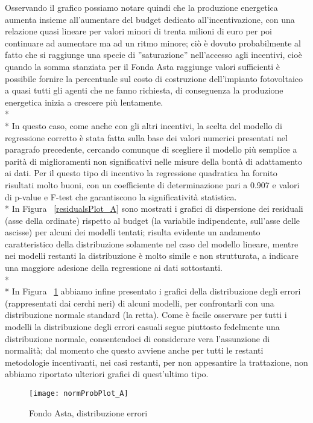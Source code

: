 \documentclass[12pt,a4paper,openright,twoside]{report}
\begin{document}
Osservando il grafico possiamo notare quindi che la produzione energetica aumenta insieme all'aumentare del budget dedicato all'incentivazione, con una relazione quasi lineare per valori minori di trenta milioni di euro per poi continuare ad aumentare ma ad un ritmo minore; ciò è dovuto probabilmente al fatto che si raggiunge una specie di ''saturazione'' nell'accesso agli incentivi, cioè quando la somma stanziata per il Fonda Asta raggiunge valori sufficienti è possibile fornire la percentuale sul costo di costruzione dell'impianto fotovoltaico a quasi tutti gli agenti che ne fanno richiesta, di conseguenza la produzione energetica inizia a crescere più lentamente.\\* \\*
In questo caso, come anche con gli altri incentivi, la scelta del modello di regressione corretto è stata fatta sulla base dei valori numerici presentati nel paragrafo precedente, cercando comunque di scegliere il modello più semplice a parità di miglioramenti non significativi nelle misure della bontà di adattamento ai dati. Per il questo tipo di incentivo la regressione quadratica ha fornito risultati molto buoni, con un coefficiente di determinazione pari a 0.907 e valori di p-value e F-test che garantiscono la significatività statistica.\\*
In Figura ~\ref{residualsPlot_A} sono mostrati i grafici di dispersione dei residuali (asse della ordinate) rispetto al budget (la variabile indipendente, sull'asse delle ascisse) per alcuni dei modelli tentati; risulta evidente un andamento caratteristico della distribuzione solamente nel caso del modello lineare, mentre nei modelli restanti la distribuzione è molto simile e non strutturata, a indicare una maggiore adesione della regressione ai dati sottostanti.\\* \\*
In Figura ~\ref{normProbPlot_A} abbiamo infine presentato i grafici della distribuzione degli errori (rappresentati dai cerchi neri) di alcuni modelli, per confrontarli con una distribuzione normale standard (la retta). Come è facile osservare per tutti i modelli la distribuzione degli errori casuali segue piuttosto fedelmente una distribuzione normale, consentendoci di considerare vera l'assunzione di normalità; dal momento che questo avviene anche per tutti le restanti metodologie incentivanti, nei casi restanti, per non appesantire la trattazione, non abbiamo riportato ulteriori grafici di quest'ultimo tipo. 

\begin{figure}[H]
	\centering
	\texttt{[image: normProbPlot\_A]}
	\caption{Fondo Asta, distribuzione errori}
	\label{normProbPlot_A}
\end{figure}
\end{document}
